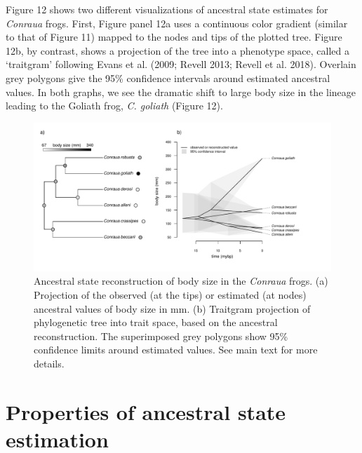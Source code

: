 \documentclass{article}
\begin{document}
Figure 12 shows two different visualizations of ancestral state estimates for \emph{Conraua} frogs. First, Figure panel 12a uses a continuous color gradient (similar to that of Figure 11) mapped to the nodes and tips of the plotted tree. Figure 12b, by contrast, shows a projection of the tree into a phenotype space, called a `traitgram' following Evans et al. (2009; Revell 2013; Revell et al. 2018). Overlain grey polygons give the 95\% confidence intervals around estimated ancestral values. In both graphs, we see the dramatic shift to large body size in the lineage leading to the Goliath frog, \emph{C. goliath} (Figure 12).

\begin{figure}
\includegraphics[width=1\linewidth]{Revell.AncestralReconstruction_files/figure-latex/fig12-1} \caption{Ancestral state reconstruction of body size in the \emph{Conraua} frogs. (a) Projection of the observed (at the tips) or estimated (at nodes) ancestral values of body size in mm. (b) Traitgram projection of phylogenetic tree into trait space, based on the ancestral reconstruction. The superimposed grey polygons show 95\% confidence limits around estimated values. See main text for more details.}\label{fig:fig12}
\end{figure}

\section{Properties of ancestral state estimation}\label{properties-of-ancestral-state-estimation}
\end{document}
